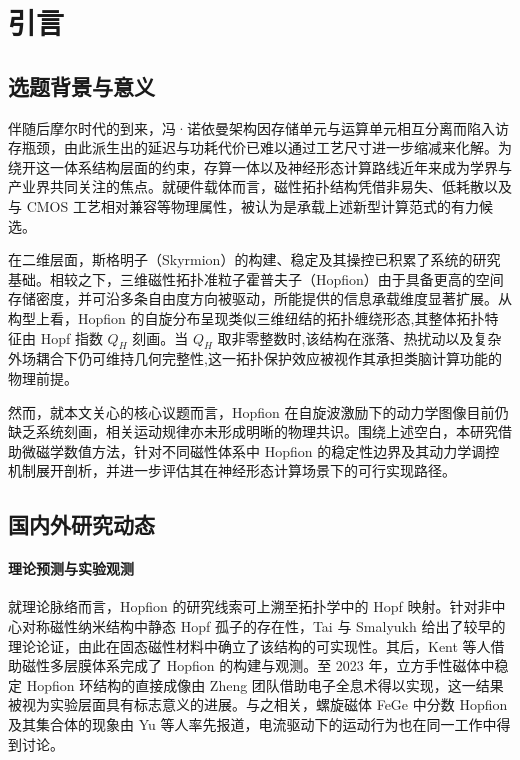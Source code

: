 \documentclass{article}
\begin{document}


\chapter{引言}

\section{选题背景与意义}

伴随后摩尔时代的到来，冯·诺依曼架构因存储单元与运算单元相互分离而陷入访存瓶颈，由此派生出的延迟与功耗代价已难以通过工艺尺寸进一步缩减来化解。为绕开这一体系结构层面的约束，存算一体以及神经形态计算路线近年来成为学界与产业界共同关注的焦点。就硬件载体而言，磁性拓扑结构凭借非易失、低耗散以及与 CMOS 工艺相对兼容等物理属性，被认为是承载上述新型计算范式的有力候选。

在二维层面，斯格明子（Skyrmion）的构建、稳定及其操控已积累了系统的研究基础。相较之下，三维磁性拓扑准粒子霍普夫子（Hopfion）由于具备更高的空间存储密度，并可沿多条自由度方向被驱动\cite{gobel2021beyond}，所能提供的信息承载维度显著扩展。从构型上看，Hopfion 的自旋分布呈现类似三维纽结的拓扑缠绕形态,其整体拓扑特征由 Hopf 指数 $Q_H$ 刻画。当 $Q_H$ 取非零整数时,该结构在涨落、热扰动以及复杂外场耦合下仍可维持几何完整性,这一拓扑保护效应被视作其承担类脑计算功能的物理前提\cite{guslienko2024review}。

然而，就本文关心的核心议题而言，Hopfion 在自旋波激励下的动力学图像目前仍缺乏系统刻画，相关运动规律亦未形成明晰的物理共识。围绕上述空白，本研究借助微磁学数值方法，针对不同磁性体系中 Hopfion 的稳定性边界及其动力学调控机制展开剖析，并进一步评估其在神经形态计算场景下的可行实现路径。


\section{国内外研究动态}

\subsubsection*{理论预测与实验观测}
就理论脉络而言，Hopfion 的研究线索可上溯至拓扑学中的 Hopf 映射。针对非中心对称磁性纳米结构中静态 Hopf 孤子的存在性，Tai 与 Smalyukh 给出了较早的理论论证\cite{tai2018static}，由此在固态磁性材料中确立了该结构的可实现性。其后，Kent 等人借助磁性多层膜体系完成了 Hopfion 的构建与观测\cite{kent2021creation}。至 2023 年，立方手性磁体中稳定 Hopfion 环结构的直接成像由 Zheng 团队借助电子全息术得以实现\cite{zheng2023hopfion}，这一结果被视为实验层面具有标志意义的进展。与之相关，螺旋磁体 FeGe 中分数 Hopfion 及其集合体的现象由 Yu 等人率先报道，电流驱动下的运动行为也在同一工作中得到讨论\cite{yu2023realization}。
\end{document}
